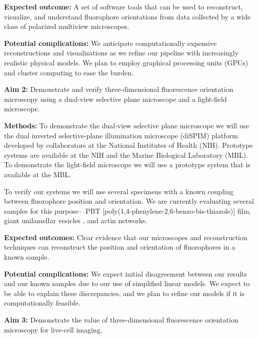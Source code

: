 \documentclass[11pt, draft]{article}
\begin{document}
\noindent\textbf{Expected outcome:} A set of software tools that can be used
to reconstruct, visualize, and understand fluorophore orientations from data
collected by a wide class of polarized multiview microscopes.

\noindent\textbf{Potential complications:} We anticipate computationally
expensive reconstructions and visualizations as we refine our pipeline with
increasingly realistic physical models. We plan to employ graphical processing
units (GPUs) and cluster computing to ease the burden.

\noindent\textbf{Aim 2:} Demonstrate and verify three-dimensional fluorescence
orientation microscopy using a dual-view selective plane microscope and a
light-field microscope.

\noindent\textbf{Methods:} To demonstrate the dual-view selective plane
microscope we will use the dual inverted selective-plane illumination
microscope (diSPIM) platform developed by collaborators at the National
Institutes of Health (NIH). Prototype systems are available at the NIH and the
Marine Biological Laboratory (MBL). To demonstrate the light-field microscope we
will use a prototype system that is available at the MBL.

To verify our systems we will use several specimens with a known coupling
between fluorophore position and orientation. We are currently evaluating
several samples for this purpose---PBT
[poly(1,4-phenylene-2,6-benzo-bis-thiazole)] film, giant unilamellar vesicles
\cite{schmid}, and actin networks.

\noindent\textbf{Expected outcomes:} Clear evidence that our microscopes and
reconstruction techniques can reconstruct the position and orientation of
fluorophores in a known sample. 

\noindent\textbf{Potential complications:} We expect initial disagreement
between our results and our known samples due to our use of simplified linear
models. We expect to be able to explain these discrepancies, and we plan to
refine our models if it is computationally feasible.

\noindent\textbf{Aim 3:} Demonstrate the value of three-dimensional fluorescence
  orientation microscopy for live-cell imaging.
\end{document}
